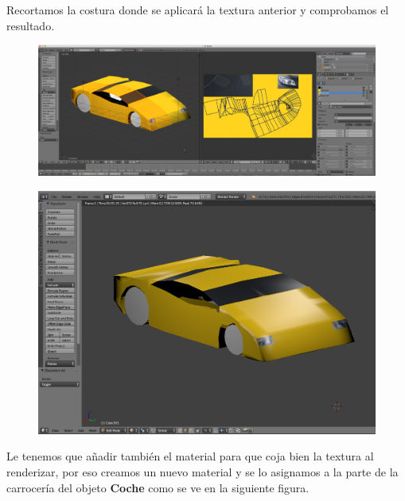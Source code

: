 \documentclass[10pt]{article}
\begin{document}
Recortamos la costura donde se aplicará la textura anterior y comprobamos el resultado. \\

\begin{figure}[H]
	\begin{center}
	 		\includegraphics[width = 1.00\textwidth]{Imagenes/p3-img18}
	\end{center} 
\end{figure}

\begin{figure}[H]
	\begin{center}
	 		\includegraphics[width = 1.00\textwidth]{Imagenes/p3-img19}
	\end{center} 
\end{figure}

Le tenemos que añadir también el material para que coja bien la textura al renderizar, por eso creamos un nuevo material y se lo asignamos a la parte de la carrocería del objeto \textbf{Coche} como se ve en la siguiente figura. \\
\end{document}
